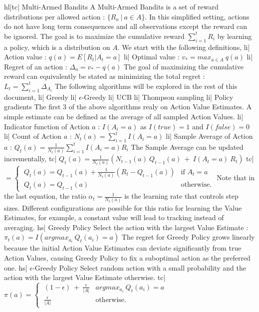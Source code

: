 hl|tc| Multi-Armed Bandits
A Multi-Armed Bandits is a set of reward distributions per allowed action : \( \{ R_a \ | \ a \in A \} \). In this simplified setting, actions do not have long term consequences and all observations except the reward can be ignored. The goal is to maximize the cumulative reward \( \sum_{i=1}^t R_i \) by learning a policy, which is a distribution on \( A \). We start with the following definitions,
li| Action value : \( q(a) = E[R_t | A_t = a] \)
li| Optimal value : \( v_* = max_{a \in A} \ q(a) \)
li| Regret of an action : \( \Delta_a = v_* - q(a) \)
The goal of maximizing the cumulative reward can equivalently be stated as minimizing the total regret : \( L_t = \sum_{i=1}^t \Delta_{A_i} \)
The following algorithms will be explored in the rest of this document,
li| Greedy
li| \(\epsilon\)-Greedy
li| UCB
li| Thompson sampling
li| Policy gradients
The first 3 of the above algorithms realy on Action Value Estimates. A simple estimate can be defined as the average of all sampled Action Values.
li| Indicator function of Action \(a\) : \( I(A_i = a) \) as \( I(true) = 1 \) and \( I(false) = 0 \)
li| Count of Action \(a\) : \( N_t(a) = \sum_{i=1}^t I(A_i = a) \)
li| Sample Average of Action \(a\) : \( Q_t(a) = \frac{1}{N_t(a)} \sum_{i=1}^t I(A_i = a) R_i \)
The Sample Average can be updated incrementally,
tc| \( Q_t(a) = \frac{1}{N_{t}(a)} (N_{t-1}(a) \ Q_{t-1}(a) \ + \ I(A_t = a) \ R_t ) \)
tc| \( = \begin{cases} \ Q_t(a) = Q_{t-1}(a) + \frac{1}{N_t(a)}(R_t - Q_{t-1}(a)) & \text{if } A_t=a \\ \ Q_t(a) = Q_{t-1}(a) & \text{otherwise.} \end{cases} \)
Note that in the last equation, the ratio \( \alpha_t = \frac{1}{N_t(a)} \) is the learning rate that controls step sizes. Different configurations are possible for this ratio for learning the Value Estimates, for example, a constant value will lead to tracking instead of averaging.
hs| Greedy Policy
Select the action with the largest Value Estimate : \( \pi_t(a) = I(argmax_{a_i} \ Q_t(a_i) = a) \)
The regret for Greedy Policy grows linearly because the initial Action Value Estimates can deviate significantly from true Action Values, causing Greedy Policy to fix a suboptimal action as the preferred one.
hs| \(\epsilon\)-Greedy Policy
Select random action with a small probability and the action with the largest Value Estimate otherwise.
tc| \( \pi(a) = \begin{cases} \ (1 - \epsilon) \ + \ \frac{\epsilon}{|A|} & argmax_{a_i} \ Q_t(a_i)=a \\ \ \frac{\epsilon}{|A|} & \text{otherwise.} \end{cases} \)

